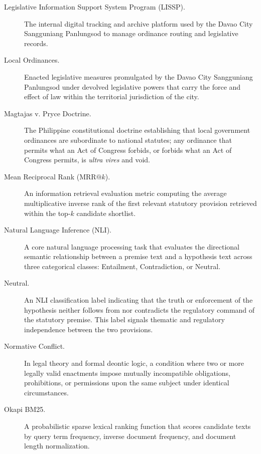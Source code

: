 \begin{description}
    \item[Legislative Information Support System Program (LISSP).] The internal digital tracking and archive platform used by the Davao City Sangguniang Panlungsod to manage ordinance routing and legislative records.

    \item[Local Ordinances.] Enacted legislative measures promulgated by the Davao City Sangguniang Panlungsod under devolved legislative powers that carry the force and effect of law within the territorial jurisdiction of the city.

    \item[Magtajas v. Pryce Doctrine.] The Philippine constitutional doctrine establishing that local government ordinances are subordinate to national statutes; any ordinance that permits what an Act of Congress forbids, or forbids what an Act of Congress permits, is \textit{ultra vires} and void.

    \item[Mean Reciprocal Rank ($\text{MRR}@k$).] An information retrieval evaluation metric computing the average multiplicative inverse rank of the first relevant statutory provision retrieved within the top-$k$ candidate shortlist.

    \item[Natural Language Inference (NLI).] A core natural language processing task that evaluates the directional semantic relationship between a premise text and a hypothesis text across three categorical classes: Entailment, Contradiction, or Neutral.

    \item[Neutral.] An NLI classification label indicating that the truth or enforcement of the hypothesis neither follows from nor contradicts the regulatory command of the statutory premise. This label signals thematic and regulatory independence between the two provisions.

    \item[Normative Conflict.] In legal theory and formal deontic logic, a condition where two or more legally valid enactments impose mutually incompatible obligations, prohibitions, or permissions upon the same subject under identical circumstances.

    \item[Okapi BM25.] A probabilistic sparse lexical ranking function that scores candidate texts by query term frequency, inverse document frequency, and document length normalization.


\end{description}
